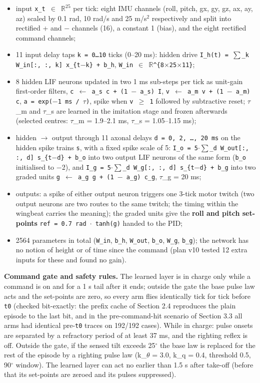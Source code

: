 \documentclass[10pt,a4paper]{article}
\begin{document}
\begin{itemize}\setlength\itemsep{2pt}
\item input \texttt{x\_t $\in$ $\mathbb{R}^{25}$} per tick: eight IMU channels (roll, pitch, gx, gy, gz, ax, ay, az) scaled by 0.1 rad, 10 rad/s and 25 m/s$^{2}$ respectively and split into rectified + and $-$ channels (16), a constant 1 (bias), and the eight rectified command channels;
\item 11 input delay taps \texttt{k = 0\ldots{}10} ticks (0--20 ms): hidden drive \texttt{I\_h(t) = $\sum$\_k W\_in[:, :, k] x\_\{t$-$k\} + b\_h}, \texttt{W\_in $\in$ $\mathbb{R}$\^{}\{8$\times$25$\times$11\}};
\item 8 hidden LIF neurons updated in two 1 ms sub-steps per tick as unit-gain first-order filters, \texttt{c $\leftarrow$ a\_s c + (1 $-$ a\_s) I}, \texttt{v $\leftarrow$ a\_m v + (1 $-$ a\_m) c}, \texttt{a = exp($-$1 ms / $\tau$)}, spike when \texttt{v $\ge$ 1} followed by subtractive reset; $\tau$\_m and $\tau$\_s are learned in the imitation stage and frozen afterwards (selected centres: $\tau$\_m = 1.9--2.1 ms, $\tau$\_s = 1.05--1.15 ms);
\item hidden $\rightarrow$ output through 11 axonal delays \texttt{d = 0, 2, \ldots{}, 20 ms} on the hidden spike trains \texttt{s}, with a fixed spike scale of 5: \texttt{I\_o = 5$\cdot\sum$\_d W\_out[:, :, d] s\_\{t$-$d\} + b\_o} into two output LIF neurons of the same form (\texttt{b\_o} initialised to $-$2), and \texttt{I\_g = 5$\cdot\sum$\_d W\_g[:, :, d] s\_\{t$-$d\} + b\_g} into two graded units \texttt{g $\leftarrow$ a\_g g + (1 $-$ a\_g) c\_g}, $\tau$\_g = 20 ms;
\item outputs: a spike of either output neuron triggers one 3-tick motor twitch (two output neurons are two routes to the same twitch; the timing within the wingbeat carries the meaning); the graded units give the \textbf{roll and pitch set-points} \texttt{ref = 0.7 rad $\cdot$ tanh(g)} handed to the PID;
\item 2564 parameters in total (\texttt{W\_in}, \texttt{b\_h}, \texttt{W\_out}, \texttt{b\_o}, \texttt{W\_g}, \texttt{b\_g}); the network has no notion of height or of time since the command (plan v10 tested 12 extra inputs for these and found no gain).
\end{itemize}

\textbf{Command gate and safety rules.} The learned layer is in charge only while a command is on and for a 1 s tail after it ends; outside the gate the base pulse law acts and the set-points are zero, so every arm flies identically tick for tick before \texttt{t0} (checked bit-exactly: the prefix cache of Section 2.4 reproduces the plain episode to the last bit, and in the pre-command-hit scenario of Section 3.3 all arms had identical pre-\texttt{t0} traces on 192/192 cases). While in charge: pulse onsets are separated by a refractory period of at least 37 ms, and the righting reflex is off. Outside the gate, if the sensed tilt exceeds 25$^\circ$ the base law is replaced for the rest of the episode by a righting pulse law (k\_$\theta$ = 3.0, k\_q = 0.4, threshold 0.5, 90$^\circ$ window). The learned layer can act no earlier than 1.5 s after take-off (before that its set-points are zeroed and its pulses suppressed).
\end{document}
